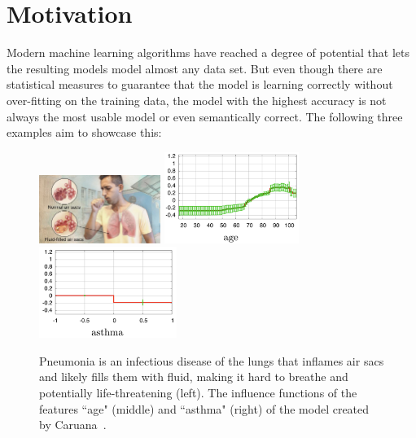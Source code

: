 \section{Motivation}
\label{sec:motivation_intro}
Modern machine learning algorithms have reached a degree of potential that lets the resulting models model almost any data set.
But even though there are statistical measures to guarantee that the model is learning correctly without over-fitting on the training data, the model with the highest accuracy is not always the most usable model or even semantically correct.
The following three examples aim to showcase this:

\begin{figure}
\centering
\includegraphics[height=6em,valign=t]{tex/introduction/pneumonia.png}
\includegraphics[height=8em,valign=t]{tex/introduction/age.png}
\includegraphics[height=8em,valign=t]{tex/introduction/asthma.png}
\caption[Influence functions of Pneumonia model.]{
Pneumonia is an infectious disease of the lungs that inflames air sacs and likely fills them with fluid, making it hard to breathe and potentially life-threatening (left\footnotemark).
The influence functions of the features ``age" (middle) and ``asthma" (right) of the model created by Caruana~\etal\cite{Caruana:2015:IMH:2783258.2788613}.
}
\label{figs:pneumonia}
\end{figure}

